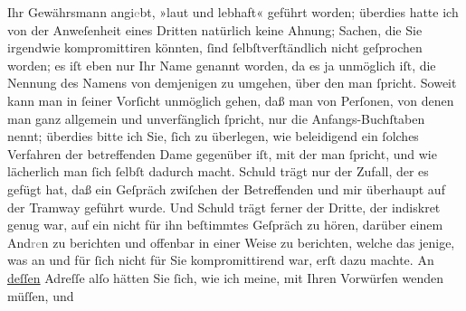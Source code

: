 \begin{ledgroupsized}[t]{13cm}
               Ihr Gewährsmann
                  angi\textcolor{gray}{e}bt, »laut und lebhaft« geführt worden; überdies hatte ich
               von der Anweſenheit eines Dritten natürlich keine Ahnung; Sachen, die Sie irgendwie kompromittiren
               könnten, ſind ſelbſtverſtändlich nicht geſprochen worden; es iſt eben nur Ihr Name
               genannt worden, da es ja unmöglich iſt, die Nennung des Namens von demjenigen zu
               umgehen, über den man ſpricht. Soweit kann man in ſeiner Vorſicht unmöglich gehen,
               daß man von Perſonen, von denen man ganz {\pb}allgemein
               und unverfänglich ſpricht, nur die Anfangs-Buchſtaben nennt; überdies bitte ich Sie,
               ſich zu überlegen, wie beleidigend ein ſolches Verfahren der betreffenden Dame gegenüber iſt, mit der
               man ſpricht, und wie lächerlich man ſich ſelbſt dadurch macht. Schuld trägt nur der
               Zufall, der es gefügt hat, daß ein Geſpräch zwiſchen der Betreffenden und mir überhaupt auf der
               Tramway geführt wurde. Und Schuld trägt ferner der Dritte, der indiskret genug war, auf ein
               nicht für ihn beſtimmtes Geſpräch zu hören, darüber einem And\textcolor{gray}{re}n
               zu berichten und offenbar in einer Weise zu berichten, welche das jenige, was an  und für ſich nicht \introOben{}für Sie\introOben{}
               kompromittirend war, erſt dazu machte. An \uline{deſſen}
               Adreſſe alſo hätten Sie ſich, wie ich meine, mit Ihren Vorwürfen wenden müſſen, und

\end{ledgroupsized}
